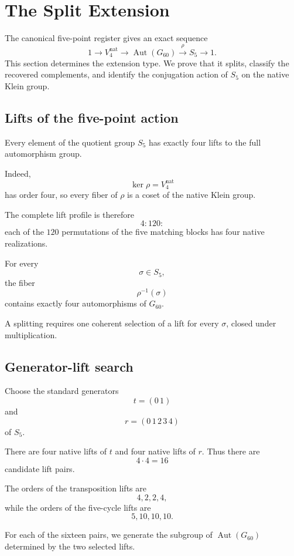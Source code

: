 \section{The Split Extension}

The canonical five-point register gives an exact sequence
\[
1
\longrightarrow
V_4^{\mathrm{nat}}
\longrightarrow
\operatorname{Aut}(G_{60})
\overset{\rho}{\longrightarrow}
S_5
\longrightarrow
1.
\]
This section determines the extension type. We prove that it splits,
classify the recovered complements, and identify the conjugation action
of \(S_5\) on the native Klein group.

\subsection{Lifts of the five-point action}

Every element of the quotient group \(S_5\) has exactly four lifts to
the full automorphism group.

Indeed,
\[
\ker\rho=V_4^{\mathrm{nat}}
\]
has order four, so every fiber of \(\rho\) is a coset of the native
Klein group.

The complete lift profile is therefore
\[
4:120:
\]
each of the \(120\) permutations of the five matching blocks has four
native realizations.

\begin{proposition}
For every
\[
\sigma\in S_5,
\]
the fiber
\[
\rho^{-1}(\sigma)
\]
contains exactly four automorphisms of \(G_{60}\).
\end{proposition}

A splitting requires one coherent selection of a lift for every
\(\sigma\), closed under multiplication.

\subsection{Generator-lift search}

Choose the standard generators
\[
t=(0\,1)
\]
and
\[
r=(0\,1\,2\,3\,4)
\]
of \(S_5\).

There are four native lifts of \(t\) and four native lifts of \(r\).
Thus there are
\[
4\cdot4=16
\]
candidate lift pairs.

The orders of the transposition lifts are
\[
4,2,2,4,
\]
while the orders of the five-cycle lifts are
\[
5,10,10,10.
\]

For each of the sixteen pairs, we generate the subgroup of
\(\operatorname{Aut}(G_{60})\) determined by the two selected lifts.

